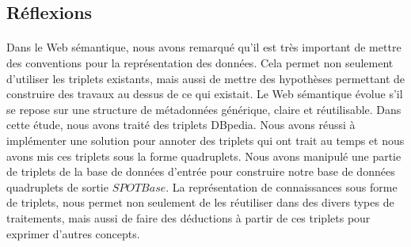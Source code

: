 \subsection{Réflexions}
\paragraph{}
Dans le Web sémantique, nous avons remarqué qu'il est très important de mettre des conventions pour la représentation des données. Cela permet non seulement d'utiliser les triplets existants, mais aussi de mettre des hypothèses permettant de construire des travaux au dessus de ce qui existait. Le Web sémantique évolue s'il se repose sur une structure de métadonnées générique, claire et réutilisable. Dans cette étude, nous avons traité des triplets DBpedia. Nous avons réussi à implémenter une solution pour annoter des triplets qui ont trait au temps et nous avons mis ces triplets sous la forme quadruplets. Nous avons manipulé une partie de triplets de la base de données d'entrée pour construire notre base de données quadruplets de sortie $SPOTBase$. La représentation de connaissances sous forme de triplets, nous permet non seulement de les réutiliser dans des divers types de traitements, mais aussi de faire des déductions à partir de ces triplets pour exprimer d'autres concepts. 
